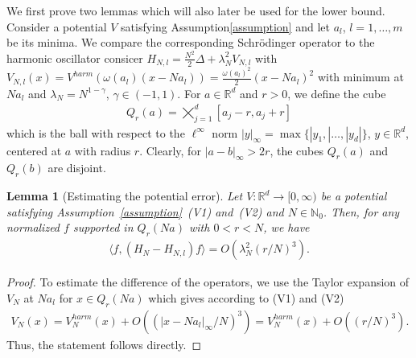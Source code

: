 \documentclass[12pt, reqno]{amsart}
\newtheorem{lemma}[theorem]{Lemma}
\theoremstyle{definition}
\numberwithin{equation}{section}
\newcommand{\R}{{\mathbb R}}
\newcommand{\N}{{\mathbb N}}
\begin{document}
We first prove two lemmas which will also later be used for the lower bound. Consider a potential $V$ satisfying Assumption\ref{assumption} and let $a_l$, $l=1,\ldots,m$ be its minima. We compare the corresponding Schrödinger operator to the harmonic oscillator consicer $H_{N,l}=\frac{N^2}2\Delta+\lambda_N^2 V_{N,l}$ with $V_{N,l}(x) =V^{harm}({\omega(a_l)}(x-Na_l))=\frac{\omega(a_l)^2}2(x-Na_l)^2$ with minimum at $Na_l$ and $\lambda_N=N^{1-\gamma}$, $\gamma\in (-1,1)$. For $a\in \R^d$ and $r>0$,  we define the cube 
\begin{align*}
    Q_{r}(a)=\bigtimes_{j=1}^{d}\left[a_{j}-r,a_{j}+r\right]
\end{align*}
which is the ball with respect to the $\ell^\infty$ norm $|y|_\infty=\max\{|y_1,|\ldots,|y_d|\}$, $y\in \R^d$, centered at $a$ with radius $r$.
Clearly, for $|a-b|_\infty>2r$, the cubes $Q_r(a)$ and $Q_r(b)$ are disjoint.


\begin{lemma}[Estimating the potential error]\label{lem:potential_difference}
    Let $V:\R^d\to [0,\infty)$ be a potential satisfying Assumption~\ref{assumption}~(V1) and~(V2) and $N\in \N_0$. Then, for any normalized $f$ supported in $Q_{r}(Na)$ with $0<r<N$, we have
    \begin{align*}
       \langle f, (H_N-H_{N,l})f\rangle = O(\lambda_N^2(r/N)^3).
    \end{align*}
\end{lemma}
\begin{proof}
     To estimate the difference of the operators, we use the Taylor expansion of $V_N$ at $Na_l$ for $ x\in Q_r(Na) $ which gives according to (V1) and (V2)
    \begin{align*}
        V_N(x) = V_N^{harm}(x) + O((|x-Na_l|_\infty/N)^3)=V_N^{harm}(x) + O((r/N)^3).
    \end{align*}
Thus, the statement follows directly.
\end{proof}
\end{document}
